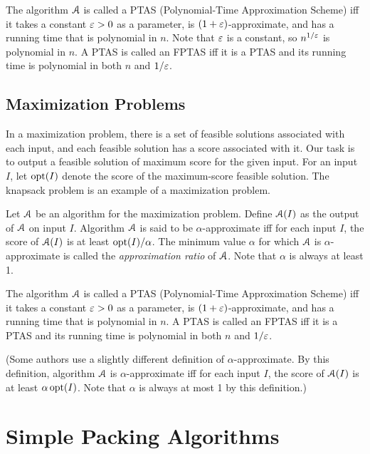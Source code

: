 The algorithm $\mathcal{A}$ is called a PTAS (Polynomial-Time Approximation Scheme)
iff it takes a constant $\varepsilon > 0$ as a parameter, is $(1+\varepsilon)$-approximate,
and has a running time that is polynomial in $n$.
Note that $\varepsilon$ is a constant, so $n^{1/\varepsilon}$ is polynomial in $n$.
A PTAS is called an FPTAS iff it is a PTAS and its running time is polynomial
in both $n$ and $1/\varepsilon$.

\subsection{Maximization Problems}
\label{sec:appx:max}

In a maximization problem, there is a set of feasible solutions associated with each input,
and each feasible solution has a score associated with it.
Our task is to output a feasible solution of maximum score for the given input.
For an input $I$, let $\operatorname{opt}(I)$ denote the score of the maximum-score feasible solution.
The knapsack problem is an example of a maximization problem.

Let $\mathcal{A}$ be an algorithm for the maximization problem.
Define $\mathcal{A}(I)$ as the output of $\mathcal{A}$ on input $I$.
Algorithm $\mathcal{A}$ is said to be $\alpha$-approximate iff
for each input $I$, the score of $\mathcal{A}(I)$ is at least $\operatorname{opt}(I)/\alpha$.
The minimum value $\alpha$ for which $\mathcal{A}$ is $\alpha$-approximate
is called the \emph{approximation ratio} of $\mathcal{A}$.
Note that $\alpha$ is always at least 1.

The algorithm $\mathcal{A}$ is called a PTAS (Polynomial-Time Approximation Scheme)
iff it takes a constant $\varepsilon > 0$ as a parameter, is $(1+\varepsilon)$-approximate,
and has a running time that is polynomial in $n$.
A PTAS is called an FPTAS iff it is a PTAS and its running time is polynomial
in both $n$ and $1/\varepsilon$.

(Some authors use a slightly different definition of $\alpha$-approximate.
By this definition, algorithm $\mathcal{A}$ is $\alpha$-approximate iff
for each input $I$, the score of $\mathcal{A}(I)$ is at least $\alpha\operatorname{opt}(I)$.
Note that $\alpha$ is always at most 1 by this definition.)

\section{Simple Packing Algorithms}

